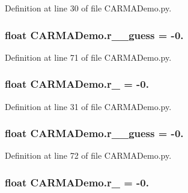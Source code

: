 Definition at line 30 of file C\-A\-R\-M\-A\-Demo.\-py.

\hypertarget{namespace_c_a_r_m_a_demo_a8b7943e46d7401e7e312db8d3a353363}{
\subsubsection[{r\-\_\-1\-\_\-guess}]{\setlength{\rightskip}{0pt plus 5cm}float C\-A\-R\-M\-A\-Demo.\-r\-\_\-\_\-guess = -\/0.}}\label{namespace_c_a_r_m_a_demo_a8b7943e46d7401e7e312db8d3a353363}


Definition at line 71 of file C\-A\-R\-M\-A\-Demo.\-py.

\hypertarget{namespace_c_a_r_m_a_demo_aac6267bad07ea88a21753363b78d8153}{
\subsubsection[{r\-\_\-2}]{\setlength{\rightskip}{0pt plus 5cm}float C\-A\-R\-M\-A\-Demo.\-r\-\_ = -\/0.}}\label{namespace_c_a_r_m_a_demo_aac6267bad07ea88a21753363b78d8153}


Definition at line 31 of file C\-A\-R\-M\-A\-Demo.\-py.

\hypertarget{namespace_c_a_r_m_a_demo_a845035ed251a896d63845939de16a0a6}{
\subsubsection[{r\-\_\-2\-\_\-guess}]{\setlength{\rightskip}{0pt plus 5cm}float C\-A\-R\-M\-A\-Demo.\-r\-\_\-\_\-guess = -\/0.}}\label{namespace_c_a_r_m_a_demo_a845035ed251a896d63845939de16a0a6}


Definition at line 72 of file C\-A\-R\-M\-A\-Demo.\-py.

\hypertarget{namespace_c_a_r_m_a_demo_a514fd8674af7ed60c5c647977b726159}{
\subsubsection[{r\-\_\-3}]{\setlength{\rightskip}{0pt plus 5cm}float C\-A\-R\-M\-A\-Demo.\-r\-\_ = -\/0.}}\label{namespace_c_a_r_m_a_demo_a514fd8674af7ed60c5c647977b726159}


